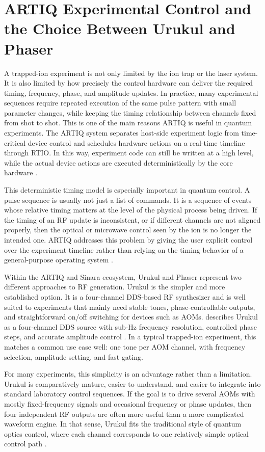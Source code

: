 \chapter{ARTIQ Experimental Control and the Choice Between Urukul and Phaser}

A trapped-ion experiment is not only limited by the ion trap or the laser system. It is also limited by how precisely the control hardware can deliver the required timing, frequency, phase, and amplitude updates. In practice, many experimental sequences require repeated execution of the same pulse pattern with small parameter changes, while keeping the timing relationship between channels fixed from shot to shot. This is one of the main reasons ARTIQ is useful in quantum experiments. The ARTIQ system separates host-side experiment logic from time-critical device control and schedules hardware actions on a real-time timeline through RTIO. In this way, experiment code can still be written at a high level, while the actual device actions are executed deterministically by the core hardware \cite{artiq_rtio, artiq_coredrivers}.

This deterministic timing model is especially important in quantum control. A pulse sequence is usually not just a list of commands. It is a sequence of events whose relative timing matters at the level of the physical process being driven. If the timing of an RF update is inconsistent, or if different channels are not aligned properly, then the optical or microwave control seen by the ion is no longer the intended one. ARTIQ addresses this problem by giving the user explicit control over the experiment timeline rather than relying on the timing behavior of a general-purpose operating system \cite{artiq_rtio}.

Within the ARTIQ and Sinara ecosystem, Urukul and Phaser represent two different approaches to RF generation. Urukul is the simpler and more established option. It is a four-channel DDS-based RF synthesizer and is well suited to experiments that mainly need stable tones, phase-controllable outputs, and straightforward on/off switching for devices such as AOMs. describes Urukul as a four-channel DDS source with sub-Hz frequency resolution, controlled phase steps, and accurate amplitude control \cite{urukul_datasheet, sinara_core}. In a typical trapped-ion experiment, this matches a common use case well: one tone per AOM channel, with frequency selection, amplitude setting, and fast gating.

For many experiments, this simplicity is an advantage rather than a limitation. Urukul is comparatively mature, easier to understand, and easier to integrate into standard laboratory control sequences. If the goal is to drive several AOMs with mostly fixed-frequency signals and occasional frequency or phase updates, then four independent RF outputs are often more useful than a more complicated waveform engine. In that sense, Urukul fits the traditional style of quantum optics control, where each channel corresponds to one relatively simple optical control path \cite{sinara_core, artiq_ad9910}.

